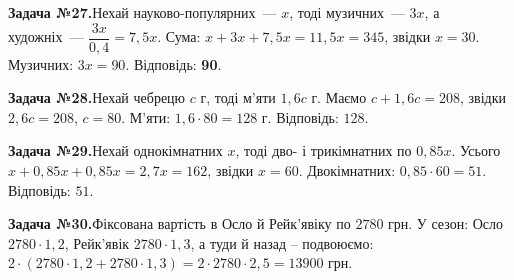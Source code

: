 \documentclass[12pt]{article}
\begin{document}
\par\vspace{0.3cm}\noindent\hypertarget{sol:27}{}
\begin{tcolorbox}[colback=titleBg!40, colframe=mainGreen!55, boxrule=0.4pt, arc=2pt, left=6pt, right=6pt, top=4pt, bottom=4pt, breakable]
\noindent\small\textbf{Задача №27.}\quad Нехай науково-популярних~--- $x$, тоді музичних~--- $3x$, а художніх~--- $\dfrac{3x}{0{,}4}=7{,}5x$. Сума: $x+3x+7{,}5x=11{,}5x=345$, звідки $x=30$. Музичних: $3x=90$. Відповідь: \textbf{90}.
\par\vspace{0.1cm}\hfill\hyperlink{task:27}{}
\end{tcolorbox}
\par\vspace{0.3cm}\noindent\hypertarget{sol:28}{}
\begin{tcolorbox}[colback=titleBg!40, colframe=mainGreen!55, boxrule=0.4pt, arc=2pt, left=6pt, right=6pt, top=4pt, bottom=4pt, breakable]
\noindent\small\textbf{Задача №28.}\quad Нехай чебрецю $c$ г, тоді м'яти $1{,}6c$ г. Маємо $c+1{,}6c=208$, звідки $2{,}6c=208$, $c=80$. М'яти: $1{,}6\cdot80=128$ г. Відповідь: $128$.
\par\vspace{0.1cm}\hfill\hyperlink{task:28}{}
\end{tcolorbox}
\par\vspace{0.3cm}\noindent\hypertarget{sol:29}{}
\begin{tcolorbox}[colback=titleBg!40, colframe=mainGreen!55, boxrule=0.4pt, arc=2pt, left=6pt, right=6pt, top=4pt, bottom=4pt, breakable]
\noindent\small\textbf{Задача №29.}\quad Нехай однокімнатних $x$, тоді дво- і трикімнатних по $0{,}85x$. Усього $x+0{,}85x+0{,}85x=2{,}7x=162$, звідки $x=60$. Двокімнатних: $0{,}85\cdot 60=51$. Відповідь: \textbf{$51$}.
\par\vspace{0.1cm}\hfill\hyperlink{task:29}{}
\end{tcolorbox}
\par\vspace{0.3cm}\noindent\hypertarget{sol:30}{}
\begin{tcolorbox}[colback=titleBg!40, colframe=mainGreen!55, boxrule=0.4pt, arc=2pt, left=6pt, right=6pt, top=4pt, bottom=4pt, breakable]
\noindent\small\textbf{Задача №30.}\quad Фіксована вартість в Осло й Рейк'явіку по $2780$ грн. У сезон: Осло $2780\cdot1{,}2$, Рейк'явік $2780\cdot1{,}3$, а туди й назад -- подвоюємо: $2\cdot(2780\cdot1{,}2+2780\cdot1{,}3)=2\cdot2780\cdot2{,}5=13900$ грн.
\par\vspace{0.1cm}\hfill\hyperlink{task:30}{}
\end{tcolorbox}
\end{document}
